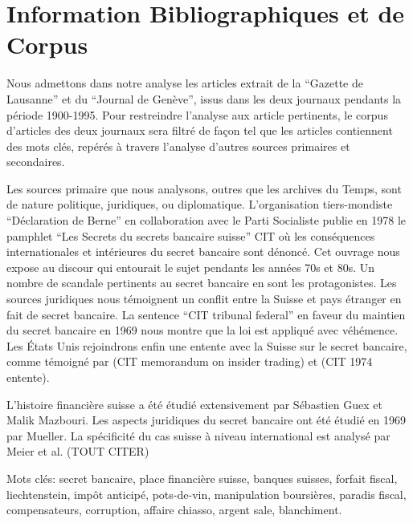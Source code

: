 \documentclass[ebook,9pt,oneside,openany]{memoir}
\begin{document}
\section*{Information Bibliographiques et de Corpus}
Nous admettons dans notre analyse les articles extrait de la “Gazette de Lausanne” et du “Journal de Genève”, issus dans les deux journaux pendants la période 1900-1995. Pour restreindre l’analyse aux article pertinents, le corpus d’articles des deux journaux sera filtré de façon tel que les articles contiennent des mots clés, repérés à travers l’analyse d’autres sources primaires et secondaires.

Les sources primaire que nous analysons, outres que les archives du Temps, sont de nature politique, juridiques, ou diplomatique.
L’organisation tiers-mondiste “Déclaration de Berne” en collaboration avec le Parti Socialiste publie en 1978 le pamphlet “Les Secrets du secrets bancaire suisse” CIT où les conséquences internationales et intérieures du secret bancaire sont dénoncé. Cet ouvrage nous expose au discour qui entourait le sujet pendants les années 70s et 80s. Un nombre de scandale pertinents au secret bancaire en sont les protagonistes.
Les sources juridiques nous témoignent un conflit entre la Suisse et pays étranger en fait de secret bancaire. La sentence “CIT tribunal federal” en faveur du maintien du secret bancaire en 1969 nous montre que la loi est appliqué avec véhémence.
Les États Unis rejoindrons enfin une entente avec la Suisse sur le secret bancaire, comme témoigné par (CIT memorandum on insider trading) et (CIT 1974 entente).

L’histoire financière suisse a été étudié extensivement par Sébastien Guex et Malik Mazbouri.
Les aspects juridiques du secret bancaire ont été étudié en 1969 par Mueller. La spécificité du cas suisse à niveau international est analysé par Meier et al. (TOUT CITER)

Mots clés: secret bancaire, place financière suisse, banques suisses, forfait fiscal, liechtenstein, impôt anticipé, pots-de-vin, manipulation boursières, paradis fiscal, compensateurs, corruption, affaire chiasso, argent sale, blanchiment.
\end{document}

